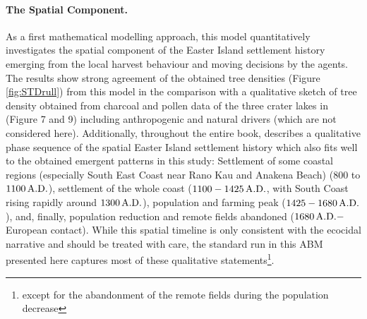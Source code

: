 \paragraph{The Spatial Component.}
As a first mathematical modelling approach, this model quantitatively investigates the spatial component of the Easter Island settlement history emerging from the local harvest behaviour and moving decisions by the agents.
The results show strong agreement of the obtained tree densities (Figure \ref{fig:STDrull}) from this model in the comparison with a qualitative sketch of tree density obtained from charcoal and pollen data of the three crater lakes in \citet{Rull2020} (Figure 7 and 9) including anthropogenic and natural drivers (which are not considered here).
Additionally, throughout the entire book, \citet{Bahn2017} describes a qualitative phase sequence of the spatial Easter Island settlement history which also fits well to the obtained emergent patterns in this study:
Settlement of some coastal regions (especially South East Coast near Rano Kau and Anakena Beach) ($800$ to $1100\, {\rm A.D.}$), settlement of the whole coast ($1100-1425\,{\rm A.D.}$, with South Coast rising rapidly around $1300\, {\rm A.D.}$), population and farming peak ($1425-1680\, {\rm A.D.}$), and, finally, population reduction and remote fields abandoned ($1680\,{\rm A.D.}-$ European contact).
While this spatial timeline is only consistent with the ecocidal narrative and should be treated with care, the standard run in this ABM presented here captures most of these qualitative statements\footnote{except for the abandonment of the remote fields during the population decrease}.




